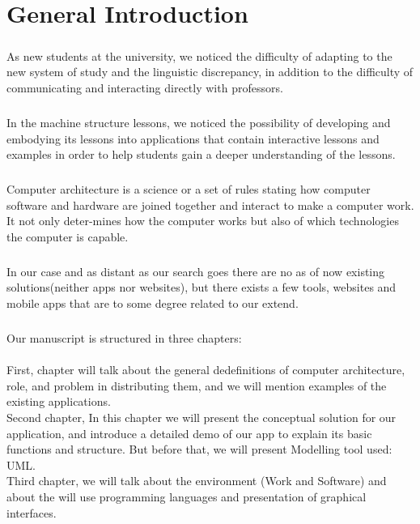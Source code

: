 \chapter*{General Introduction}
\lhead{}

\paragraph{}
As new students at the university, we noticed the difficulty of adapting to the new system of study and the linguistic discrepancy, in addition to the difficulty of communicating and interacting directly with professors.

\paragraph{}
In the machine structure lessons, we noticed the possibility of developing and embodying its lessons into applications that contain interactive lessons and examples in order to help students gain a deeper understanding of the lessons.


\paragraph{}
Computer architecture is a science or a set of rules stating how computer software and hardware are joined together and interact to make a computer work. It not only deter-mines how the computer works but also of which technologies the computer is capable.\cite{Computer-Architecture-saylor-academy}


\paragraph{}
In our case and as distant as our search goes there are no as of now existing solutions(neither apps nor websites), but there exists a few tools, websites and mobile apps that are to some degree related to our extend.

\paragraph{}
Our manuscript is structured in three chapters:\\\\
First, chapter will talk about the general dedefinitions of computer architecture, role, and problem in distributing them, and we will mention examples of the existing applications.
\\Second chapter, In this chapter we will present the conceptual solution for our application, and introduce a detailed demo of our app to explain its basic functions and structure. But before that, we will present Modelling tool used: UML.
\\Third chapter, we will talk about the environment (Work and Software) and about the will use programming languages and presentation of graphical interfaces. 
